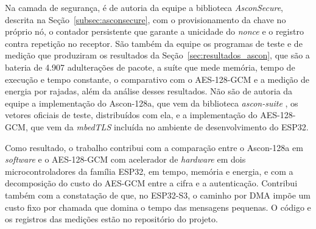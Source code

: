 Na camada de segurança, é de autoria da equipe a biblioteca \textit{AsconSecure}, descrita na Seção~\ref{subsec:asconsecure}, com o provisionamento da chave no próprio nó, o contador persistente que garante a unicidade do \textit{nonce} e o registro contra repetição no receptor. São também da equipe os programas de teste e de medição que produziram os resultados da Seção~\ref{sec:resultados_ascon}, que são a bateria de 4.907 adulterações de pacote, a suíte que mede memória, tempo de execução e tempo constante, o comparativo com o AES-128-GCM e a medição de energia por rajadas, além da análise desses resultados. Não são de autoria da equipe a implementação do Ascon-128a, que vem da biblioteca \textit{ascon-suite} \cite{weatherley2023ascon}, os vetores oficiais de teste, distribuídos com ela, e a implementação do AES-128-GCM, que vem da \textit{mbedTLS} incluída no ambiente de desenvolvimento do ESP32.

Como resultado, o trabalho contribui com a comparação entre o Ascon-128a em \textit{software} e o AES-128-GCM com acelerador de \textit{hardware} em dois microcontroladores da família ESP32, em tempo, memória e energia, e com a decomposição do custo do AES-GCM entre a cifra e a autenticação. Contribui também com a constatação de que, no ESP32-S3, o caminho por DMA impõe um custo fixo por chamada que domina o tempo das mensagens pequenas. O código e os registros das medições estão no repositório do projeto.
